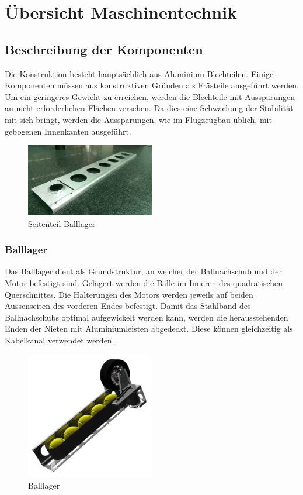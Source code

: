 \section{Übersicht Maschinentechnik}

\subsection{Beschreibung der Komponenten}
Die Konstruktion besteht hauptsächlich aus Aluminium-Blechteilen. Einige 
Komponenten müssen aus konstruktiven Gründen als Frästeile ausgeführt werden. 
Um ein geringeres Gewicht zu erreichen, werden die Blechteile mit Aussparungen 
an nicht erforderlichen Flächen versehen. Da dies eine Schwächung der 
Stabilität mit sich bringt, werden die Aussparungen, wie im Flugzeugbau 
üblich, mit gebogenen Innenkanten ausgeführt.

\begin{figure}[h!]
    \centering
    \includegraphics[width=0.5\textwidth]{fig/IMAG0364.jpg}
    \caption{Seitenteil Balllager}
    \label{fig:balllager_side}
\end{figure}

\subsubsection{Balllager}
Das Balllager dient als Grundstruktur, an welcher der Ballnachschub und der 
Motor befestigt sind. Gelagert werden die Bälle im Inneren des quadratischen 
Querschnittes. Die Halterungen des Motors werden jeweils auf beiden 
Aussenseiten des vorderen Endes befestigt. Damit das Stahlband des 
Ballnachschubs optimal aufgewickelt werden kann, werden die herausstehenden 
Enden der Nieten mit Aluminiumleisten abgedeckt. Diese können gleichzeitig als 
Kabelkanal verwendet werden. 

\begin{figure}[h!]
    \centering
    \includegraphics[width=0.5\textwidth]{fig/15.png}
    \caption{Balllager}
    \label{fig:balllager}
\end{figure}

